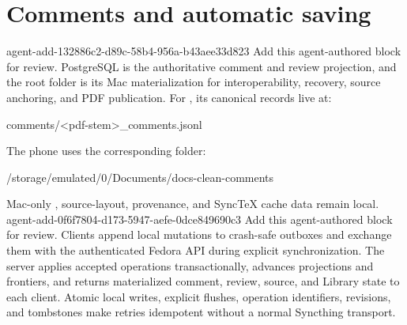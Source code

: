 \section*{Comments and automatic saving}
\label{sec:comment-sidecars}
\agentProposedEdit
  {agent-add-132886c2-d89c-58b4-956a-b43aee33d823}
  {Add this agent-authored block for review.}
  {}
  {PostgreSQL is the authoritative comment and review projection, and the root  folder is its Mac materialization for interoperability, recovery, source anchoring, and PDF publication.}
For , its canonical records live at:
\begin{DocCode}
comments/<pdf-stem>_comments.jsonl
\end{DocCode}
The phone uses the corresponding folder:
\begin{DocCode}
/storage/emulated/0/Documents/docs-clean-comments
\end{DocCode}
Mac-only , source-layout, provenance, and SyncTeX cache data remain local.
\agentProposedEdit
  {agent-add-0f6f7804-d173-5947-aefe-0dce849690c3}
  {Add this agent-authored block for review.}
  {}
  {Clients append local mutations to crash-safe outboxes and exchange them with the authenticated Fedora API during explicit synchronization.
The server applies accepted operations transactionally, advances projections and frontiers, and returns materialized comment, review, source, and Library state to each client.
Atomic local writes, explicit flushes, operation identifiers, revisions, and tombstones make retries idempotent without a normal Syncthing transport.}

